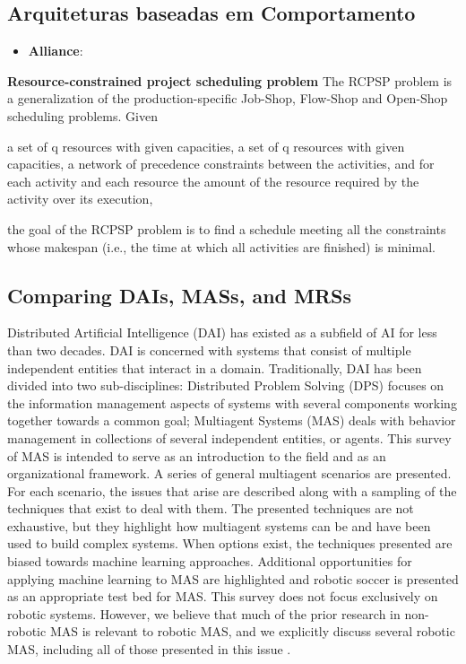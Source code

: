         \subsection{Arquiteturas baseadas em Comportamento}
        
        \begin{itemize}
            \item \textbf{Alliance}:
            
        \end{itemize}
        
        
        \textbf{Resource-constrained project scheduling problem}
        The RCPSP problem is a generalization of the production-specific Job-Shop, Flow-Shop and Open-Shop scheduling problems. Given
        
            a set of q resources with given capacities,
            a set of q resources with given capacities,
            a network of precedence constraints between the activities, and
            for each activity and each resource the amount of the resource required by the activity over its execution,
        
        the goal of the RCPSP problem is to find a schedule meeting all the constraints whose makespan (i.e., the time at which all activities are finished) is minimal.
        
        
        \subsection{Comparing DAIs, MASs, and MRSs}
        
        Distributed Artificial Intelligence (DAI) has existed as a subfield of AI for less than two decades. DAI is concerned with systems that consist of multiple independent entities that interact in a domain. Traditionally, DAI has been divided into two sub-disciplines: Distributed Problem Solving (DPS) focuses on the information management aspects of systems with several components working together towards a common goal; Multiagent Systems (MAS) deals with behavior management in collections of several independent entities, or agents. This survey of MAS is intended to serve as an introduction to the field and as an organizational framework. A series of general multiagent scenarios are presented. For each scenario, the issues that arise are described along with a sampling of the techniques that exist to deal with them. The presented techniques are not exhaustive, but they highlight how multiagent systems can be and have been used to build complex systems. When options exist, the techniques presented are biased towards machine learning approaches. Additional opportunities for applying machine learning to MAS are highlighted and robotic soccer is presented as an appropriate test bed for MAS. This survey does not focus exclusively on robotic systems. However, we believe that much of the prior research in non-robotic MAS is relevant to robotic MAS, and we explicitly discuss several robotic MAS, including all of those presented in this issue \cite{ref:stone2000multiagent}.
        
